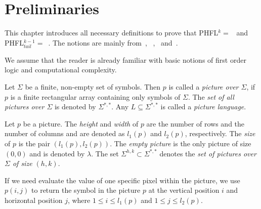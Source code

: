 \section{Preliminaries}
\label{sec:preliminaries}
This chapter introduces all necessary definitions to prove that PHFL$^k = $~ and
PHFL$^{k-1}_{tail} =$~. The notions are mainly from~\cite{immerman1999descriptive},
~\cite{papadimitriou1994complexity},~\cite{otto1999bisimulation} and~\cite{lange2014capturing}.

We assume that the reader is already familiar with basic notions of first order logic and computational complexity.



\begin{definition}
	Let $\Sigma$ be a finite, non-empty set of symbols. Then $p$ is called a \emph{picture over
	$\Sigma$}, if $p$ is a finite rectangular array containing only symbols of $\Sigma$. The \emph{set
	of all pictures over $\Sigma$} is denoted by $\Sigma^{*,*}$. Any $L\subseteq\Sigma^{*,*}$ is called a
	\emph{picture language}.
\end{definition}
Let $p$ be a picture. The \emph{height} and \emph{width} of $p$ are the number of rows and the
number of columns and are denoted as $l_1(p)$ and $l_2(p)$, respectively. The \emph{size} of $p$ is
the pair $(l_1(p), l_2(p))$. The \emph{empty picture} is the only picture of size $(0, 0)$ and is
denoted by $\lambda$. The set $\Sigma^{h, k} \subset \Sigma^{*, *}$ denotes the \emph{set of
pictures over $\Sigma$ of size $(h, k)$}.

If we need evaluate the value of one specific pixel within the picture, we use $p(i, j)$ to return
the symbol in the picture $p$ at the vertical position $i$ and horizontal position $j$, where $1
\leq i \leq l_1(p)$ and $1 \leq j \leq l_2(p)$.

